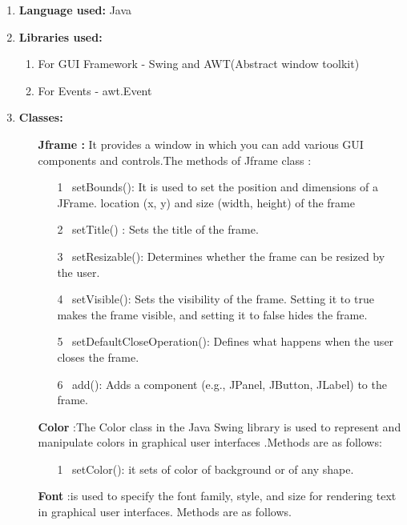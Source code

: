 \documentclass{article}
\begin{document}
\begin{enumerate}
    \item \textbf{Language used: } Java
    \item \textbf{Libraries used: }
    \begin{enumerate}
        \item For GUI Framework - Swing and AWT(Abstract window toolkit)
        \item  For Events  -  awt.Event\\
    \end{enumerate}
    \item \textbf{Classes: }
    \begin{enumerate}
        \item [\bullet] \textbf{Jframe : } It provides a window in which you can add various GUI components and controls.The methods of Jframe class :
        \begin{enumerate}
        \item[1]\ setBounds(): It is used to set the position and 
           dimensions of a JFrame. location (x, y) and size (width, height) of the frame 
        \item[2]\ setTitle() :  Sets the title of the frame.
        \item[3]\ setResizable(): Determines whether the frame can be 
          resized by the user.
        \item[4]\ setVisible(): Sets the visibility of the frame. Setting it to true makes the frame visible, and setting it to false hides the frame.
        \item[5]\ setDefaultCloseOperation(): Defines what happens when the 
             user closes the frame. 
        \item[6]\ add(): Adds a component (e.g., JPanel, JButton, JLabel) to the frame.
        \end{enumerate}
     \item [\bullet] \textbf {Color} :The Color class in the Java Swing library is used to represent and manipulate colors in graphical user interfaces .Methods are as follows:
        \begin{enumerate}
          \item[1]\ setColor(): it sets of color of background or of any shape.
          \end{enumerate}
    \item [\bullet] \textbf{Font} :is used to specify the font family, style, and size for rendering text in graphical user interfaces. Methods are as follows.

\end{enumerate}
\end{enumerate}
\end{document}

